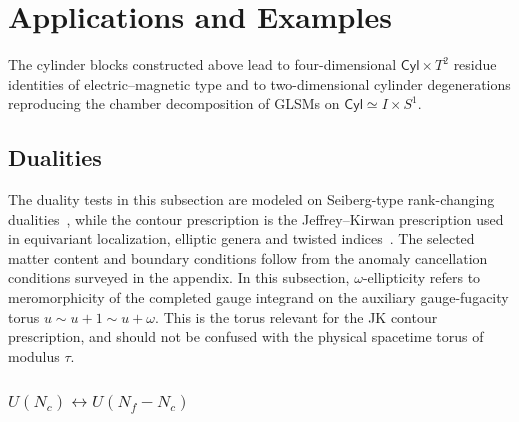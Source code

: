 \documentclass[11pt,a4paper]{article}
\numberwithin{equation}{section}
\theoremstyle{plain}
\theoremstyle{definition}
\theoremstyle{remark}
\newcommand{\cyl}{\mathsf{Cyl}}
\begin{document}
\section{Applications and Examples}\label{sec:applications-examples}

The cylinder blocks constructed above lead to four-dimensional $\cyl\times T^2$ residue identities of electric--magnetic type and to two-dimensional cylinder degenerations reproducing the chamber decomposition of GLSMs on $\cyl\simeq I\times S^1$.



\subsection{Dualities}\label{sec:duality}

The duality tests in this subsection are modeled on Seiberg-type rank-changing dualities~\cite{Seiberg:1994pq}, while the contour prescription is the Jeffrey--Kirwan prescription used in equivariant localization, elliptic genera and twisted indices~\cite{JeffreyKirwan1995,Benini:2013xpa,Benini:2013nda,Closset:2017zgf}. The selected matter content and boundary conditions follow from the anomaly cancellation conditions surveyed in the appendix. In this subsection, $\omega$-ellipticity refers to meromorphicity of the completed gauge integrand on the auxiliary gauge-fugacity torus \(u\sim u+1\sim u+\omega\). This is the torus relevant for the JK contour prescription, and should not be confused with the physical spacetime torus of modulus \(\tau\).

  \subsubsection{\texorpdfstring{\(U(N_c)\leftrightarrow U(N_f-N_c)\)}{U(Nc) <-> U(Nf-Nc)}}


\label{subsubsec:UNc-reinterpreted}
\end{document}
